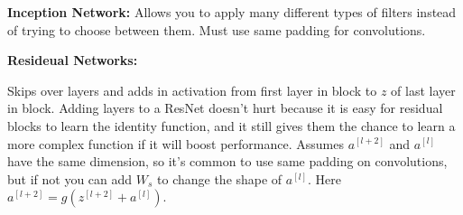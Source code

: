\textbf{Inception Network: } Allows you to apply many different types of filters instead of trying to choose between them. Must use same padding for convolutions.

\textbf{Resideual Networks:}

Skips over layers and adds in activation from first layer in block to $z$ of last layer in block. Adding layers to a ResNet doesn't hurt because it is easy for residual blocks to learn the identity function, and it still gives them the chance to learn a more complex function if it will boost performance. Assumes $a^{[l+2]}$ and $a^{[l]}$ have the same dimension, so it's common to use same padding on convolutions, but if not you can add $W_s$ to change the shape of $a^{[l]}$. Here $a^{[l+2]} = g(z^{[l+2]} + a^{[l]})$.



